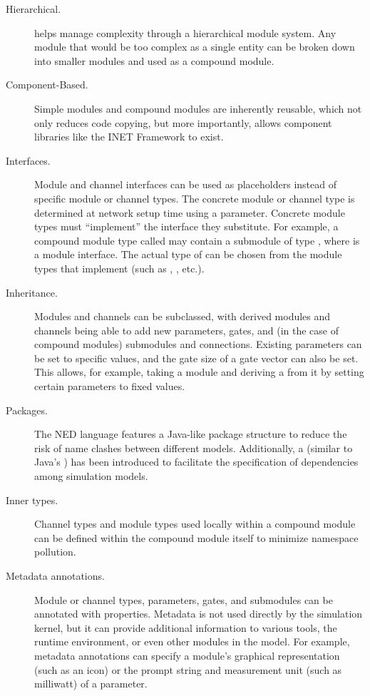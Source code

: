 \begin{description}

  \item[Hierarchical.] {\opp} helps manage complexity through a hierarchical module system.
    Any module that would be too complex as a single entity can be
    broken down into smaller modules and used as a compound module.

  \item[Component-Based.] Simple modules and compound modules are inherently
    reusable, which not only reduces code copying, but more importantly, allows
    component libraries like the INET Framework to exist.

  \item[Interfaces.] Module and channel interfaces can be used as placeholders
    instead of specific module or channel types. The concrete module or channel type
    is determined at network setup time using a parameter. Concrete module types
    must ``implement'' the interface they substitute. For example, a compound module
    type called  may contain a  submodule of type
    , where  is a module interface. The actual type
    of  can be chosen from the module types that implement
     (such as , , etc.).

  \item[Inheritance.] Modules and channels can be subclassed, with derived modules
    and channels being able to add new parameters, gates, and (in the case of compound
    modules) submodules and connections. Existing parameters can be set to specific
    values, and the gate size of a gate vector can also be set. This allows, for
    example, taking a  module and deriving a
     from it by setting certain parameters to fixed values.

  \item[Packages.] The NED language features a Java-like package structure to
    reduce the risk of name clashes between different models. Additionally, a
     (similar to Java's ) has been introduced to
    facilitate the specification of dependencies among simulation models.

  \item[Inner types.] Channel types and module types used locally within a
    compound module can be defined within the compound module itself to minimize
    namespace pollution.

  \item[Metadata annotations.] Module or channel types, parameters, gates, and
    submodules can be annotated with properties. Metadata is not used directly by
    the simulation kernel, but it can provide additional information to various
    tools, the runtime environment, or even other modules in the model. For example,
    metadata annotations can specify a module's graphical representation (such as an
    icon) or the prompt string and measurement unit (such as milliwatt) of a
    parameter.

\end{description}

